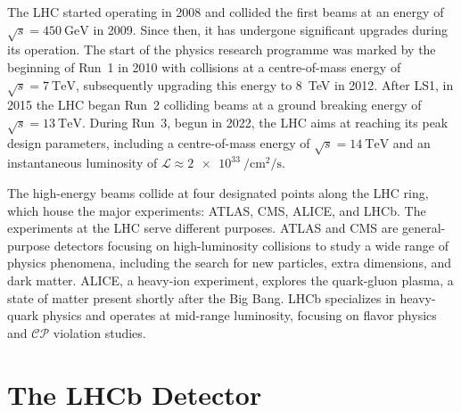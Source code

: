 The LHC started operating in 2008 and collided the first beams at an energy of $\sqrt{s}=\SI{450}{\giga\eV}$ in 2009. Since then, it has undergone significant upgrades during its operation. The start of the physics research programme was marked by the beginning of Run~1 in 2010 with collisions at a centre-of-mass energy of  $\sqrt{s}=\SI{7}{\tera\eV}$, subsequently upgrading this energy to \SI{8}{\tera\eV} in 2012. After LS1, in 2015 the LHC began Run~2 colliding beams at a ground breaking energy of  $\sqrt{s}=\SI{13}{\tera\eV}$. During Run~3, begun in 2022, the LHC aims at reaching its peak design parameters, including a centre-of-mass energy of $\sqrt{s}=\SI{14}{\tera\eV}$ and an instantaneous luminosity of $\mathcal{L}\approx\SI{2e33}{\per\centi\meter\squared\per\second}$.

The high-energy beams collide at four designated points along the LHC ring, which house the major experiments: ATLAS, CMS, ALICE, and LHCb.
The experiments at the LHC serve different purposes. ATLAS and CMS are general-purpose detectors focusing on high-luminosity collisions to study a wide range of physics phenomena, including the search for new particles, extra dimensions, and dark matter. ALICE, a heavy-ion experiment, explores the quark-gluon plasma, a state of matter present shortly after the Big Bang. LHCb specializes in heavy-quark physics and operates at mid-range luminosity, focusing on flavor physics and $\mathcal{CP}$ violation studies.

\section{The LHCb Detector}\label{sec:detector}

